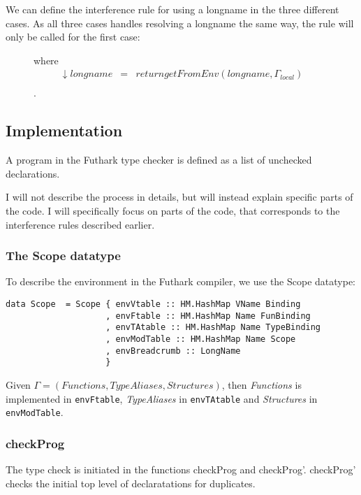 We can define the interference rule for using a longname in the three different
cases. As all three cases handles resolving a longname the same way, the rule
will only be called for the first case:

\begin{figure}\label{Rule5}
  \begin{prooftree}
  \end{prooftree}
  
  where
  \begin{align*}
    \downarrow longname & = & return getFromEnv(longname , \Gamma_{local}) \\
  \end{align*}.
\end{figure}


\subsection{Implementation}

A program in the Futhark type checker is defined as a list of unchecked
declarations.

I will not describe the process in details, but will instead
explain specific parts of the code.
I will specifically focus on parts of the code, that corresponds to the
interference rules described earlier.

\subsubsection{The Scope datatype}
To describe the environment in the Futhark compiler, we use the Scope datatype:
\begin{verbatim}
data Scope  = Scope { envVtable :: HM.HashMap VName Binding
                    , envFtable :: HM.HashMap Name FunBinding
                    , envTAtable :: HM.HashMap Name TypeBinding
                    , envModTable :: HM.HashMap Name Scope
                    , envBreadcrumb :: LongName
                    }
\end{verbatim}
Given $\Gamma = (Functions, TypeAliases, Structures)$, then \textit{Functions} is
implemented in \texttt{envFtable}, \textit{TypeAliases} in \texttt{envTAtable} and \textit{Structures} in \texttt{envModTable}.
\subsubsection{checkProg}
The type check is initiated in the functions checkProg and checkProg'.
checkProg' checks the initial top level of declaratations for duplicates.


